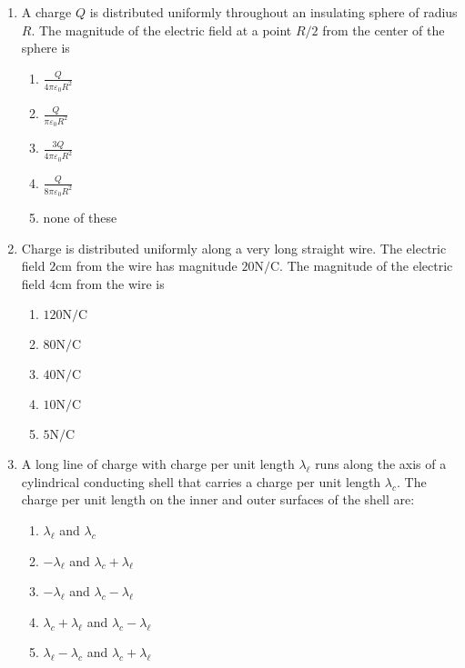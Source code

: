 \documentclass[10pt]{article}
\begin{document}
\begin{enumerate}[resume, itemsep = 5mm]
  \item A charge $Q$ is distributed uniformly throughout an insulating
    sphere of radius $R$.  The magnitude of the electric field at a
    point $R/2$ from the center of the sphere is
    \begin{enumerate}
      \item $\displaystyle \frac{Q}{4\pi\varepsilon_0R^2}$
      \item $\displaystyle \frac{Q}{\pi\varepsilon_0R^2}$
      \item $\displaystyle \frac{3Q}{4\pi\varepsilon_0R^2}$
      \item $\displaystyle \frac{Q}{8\pi\varepsilon_0R^2}$
      \item none of these
    \end{enumerate}

  \item Charge is distributed uniformly along a very long straight
    wire.  The electric field $2\si{\centi\meter}$ from the wire has
    magnitude $20\si{\newton\per\coulomb}$.  The magnitude of the
    electric field $4\si{\centi\meter}$ from the wire is
    \begin{enumerate}
      \item $120\si{\newton\per\coulomb}$
      \item $80\si{\newton\per\coulomb}$
      \item $40\si{\newton\per\coulomb}$
      \item $10\si{\newton\per\coulomb}$
      \item $5\si{\newton\per\coulomb}$
    \end{enumerate}

  \item A long line of charge with charge per unit length
    $\lambda_\ell$ runs along the axis of a cylindrical conducting
    shell that carries a charge per unit length $\lambda_c$.  The
    charge per unit length on the inner and outer surfaces of the
    shell are:
    \begin{enumerate}
      \item $\lambda_\ell$ and $\lambda_c$
      \item $-\lambda_\ell$ and $\lambda_c + \lambda_\ell$
      \item $-\lambda_\ell$ and $\lambda_c - \lambda_\ell$
      \item $\lambda_c + \lambda_\ell$ and $\lambda_c - \lambda_\ell$
      \item $\lambda_\ell - \lambda_c$ and $\lambda_c + \lambda_\ell$
    \end{enumerate}


\end{enumerate}
\end{document}

